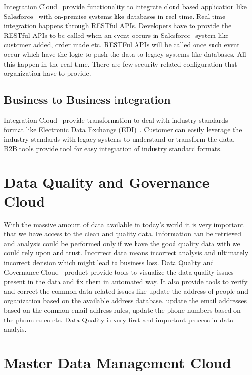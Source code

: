 Integration Cloud~\cite{hid-sp18-511-iics} provide functionality to
integrate cloud based application like
Salesforce~\cite{hid-sp18-511-salesforce} with on-premise systems like
databases in real time. Real time integration happens through RESTful
APIs. Developers have to provide the RESTful APIs to be called when an
event occurs in Salesforce~\cite{hid-sp18-511-salesforce} system like
customer added, order made etc. RESTFul APIs will be called once such
event occur which have the logic to push the data to legacy systems
like databases. All this happen in the real time. There are few
security related configuration that organization have to provide.

\subsection{Business to Business integration}

Integration Cloud~\cite{hid-sp18-511-iics} provide transformation to
deal with industry standards format like Electronic Data Exchange
(EDI)~\cite{hid-sp18-511-edi}. Customer can easily leverage the
industry standards with legacy systems to understand or transform the
data. B2B tools provide tool for easy integration of industry standard
formats.

\section{Data Quality and Governance Cloud}

With the massive amount of data available in today's world it is very
important that we have access to the clean and quality
data. Information can be retrieved and analysis could be performed
only if we have the good quality data with we could rely upon and
trust. Incorrect data means incorrect analysis and ultimately
incorrect decision which might lead to business loss. Data Quality and
Governance Cloud~\cite{hid-sp18-511-iics} product provide tools to
visualize the data quality issues present in the data and fix them in
automated way. It also provide tools to verify and correct the common
data related issues like update the address of people and organization
based on the available address database, update the email addresses
based on the common email address rules, update the phone numbers
based on the phone rules etc. Data Quality is very first and important
process in data analyis.

\section{Master Data Management Cloud}

